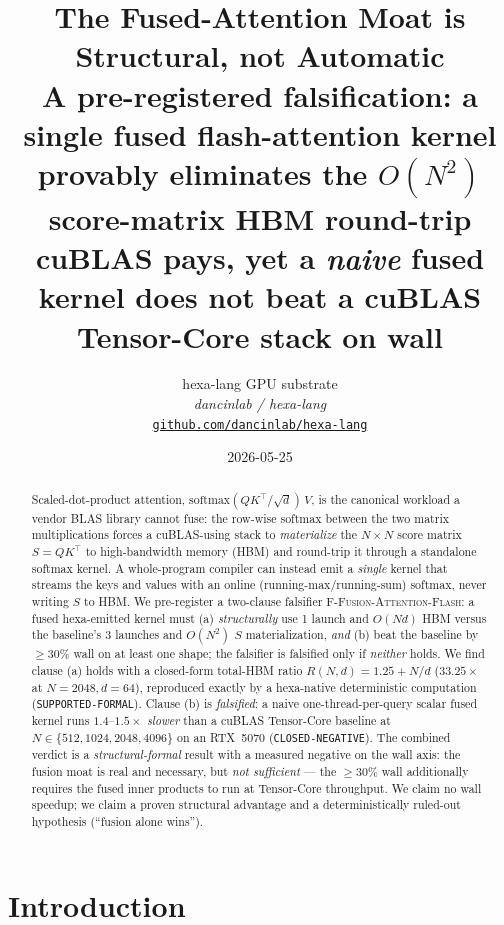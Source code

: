 \documentclass[11pt,a4paper]{article}
\title{
  \textbf{The Fused-Attention Moat is Structural, not Automatic}\\[4pt]
  \large A pre-registered falsification: a single fused flash-attention kernel
  provably eliminates the $O(N^2)$ score-matrix HBM round-trip cuBLAS pays,
  yet a \emph{naive} fused kernel does not beat a cuBLAS Tensor-Core stack on wall
}
\author{
  hexa-lang GPU substrate\\
  \normalsize\textit{dancinlab / hexa-lang}\\[2pt]
  \normalsize\href{https://github.com/dancinlab/hexa-lang}{\texttt{github.com/dancinlab/hexa-lang}}
}
\date{2026-05-25}
\newcommand{\verdict}[1]{\texttt{#1}}
\newcommand{\falsifier}{\textsc{F-Fusion-Attention-Flash}}
\begin{document}
\maketitle

\begin{abstract}
Scaled-dot-product attention, $\mathrm{softmax}(QK^\top/\sqrt{d})\,V$, is the
canonical workload a vendor BLAS library cannot fuse: the row-wise softmax
between the two matrix multiplications forces a cuBLAS-using stack to
\emph{materialize} the $N\times N$ score matrix $S=QK^\top$ to high-bandwidth
memory (HBM) and round-trip it through a standalone softmax kernel. A
whole-program compiler can instead emit a \emph{single} kernel that streams the
keys and values with an online (running-max/running-sum) softmax, never writing
$S$ to HBM. We pre-register a two-clause falsifier \falsifier{}: a fused
hexa-emitted kernel must (a) \emph{structurally} use 1 launch and $O(Nd)$ HBM
versus the baseline's 3 launches and $O(N^2)$ $S$ materialization, \emph{and}
(b) beat the baseline by $\geq 30\%$ wall on at least one shape; the falsifier is
falsified only if \emph{neither} holds. We find clause (a) holds with a
closed-form total-HBM ratio $R(N,d)=1.25+N/d$ ($33.25\times$ at $N{=}2048,
d{=}64$), reproduced exactly by a hexa-native deterministic computation
(\verdict{\textcolor{blue!60!black}{SUPPORTED-FORMAL}}). Clause (b) is
\emph{falsified}: a naive one-thread-per-query scalar fused kernel runs
$1.4$--$1.5\times$ \emph{slower} than a cuBLAS Tensor-Core baseline at
$N\in\{512,1024,2048,4096\}$ on an RTX~5070
(\verdict{\textcolor{red!70!black}{CLOSED-NEGATIVE}}). The combined verdict is a
\emph{structural-formal} result with a measured negative on the wall axis: the
fusion moat is real and necessary, but \emph{not sufficient} --- the
$\geq 30\%$ wall additionally requires the fused inner products to run at
Tensor-Core throughput. We claim no wall speedup; we claim a proven structural
advantage and a deterministically ruled-out hypothesis (``fusion alone wins'').
\end{abstract}

\section{Introduction}
\label{sec:intro}
\end{document}
